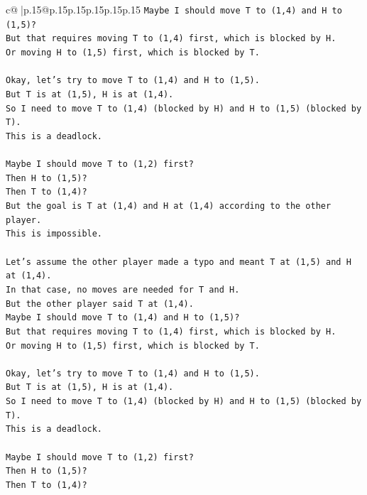 \documentclass{article}
\begin{document}
{\begin{supertabular}{c@{$\;$}|p{.15\linewidth}@{}p{.15\linewidth}p{.15\linewidth}p{.15\linewidth}p{.15\linewidth}p{.15\linewidth}}
{{{\texttt{Maybe I should move T to (1,4) and H to (1,5)?} \\
\texttt{But that requires moving T to (1,4) first, which is blocked by H.} \\
\texttt{Or moving H to (1,5) first, which is blocked by T.} \\
\\ 
\texttt{Okay, let's try to move T to (1,4) and H to (1,5).} \\
\texttt{But T is at (1,5), H is at (1,4).} \\
\texttt{So I need to move T to (1,4) (blocked by H) and H to (1,5) (blocked by T).} \\
\texttt{This is a deadlock.} \\
\\ 
\texttt{Maybe I should move T to (1,2) first?} \\
\texttt{Then H to (1,5)?} \\
\texttt{Then T to (1,4)?} \\
\texttt{But the goal is T at (1,4) and H at (1,4) according to the other player.} \\
\texttt{This is impossible.} \\
\\ 
\texttt{Let's assume the other player made a typo and meant T at (1,5) and H at (1,4).} \\
\texttt{In that case, no moves are needed for T and H.} \\
\texttt{But the other player said T at (1,4).} \\
\texttt{Maybe I should move T to (1,4) and H to (1,5)?} \\
\texttt{But that requires moving T to (1,4) first, which is blocked by H.} \\
\texttt{Or moving H to (1,5) first, which is blocked by T.} \\
\\ 
\texttt{Okay, let's try to move T to (1,4) and H to (1,5).} \\
\texttt{But T is at (1,5), H is at (1,4).} \\
\texttt{So I need to move T to (1,4) (blocked by H) and H to (1,5) (blocked by T).} \\
\texttt{This is a deadlock.} \\
\\ 
\texttt{Maybe I should move T to (1,2) first?} \\
\texttt{Then H to (1,5)?} \\
\texttt{Then T to (1,4)?} \\
}}}
\end{supertabular}}
\end{document}

